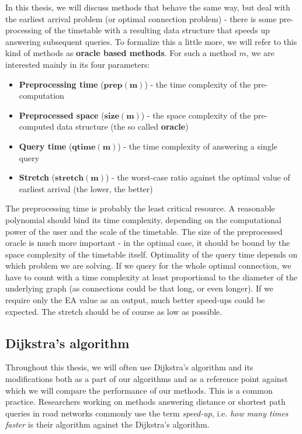 	In this thesis, we will discuss methods that behave the same way, but deal with the earliest arrival problem (or optimal connection problem) - there is some pre-processing of the timetable with a resulting data structure that speeds up answering subsequent queries. To formalize this a little more, we will refer to this kind of methods as \textbf{oracle based methods}. For such a method $m$, we are interested mainly in its four parameters:
	\begin{itemize}
		\item \textbf{Preprocessing time} ($\bm{prep(m)}$) - the time complexity of the pre-computation
		\item \textbf{Preprocessed space} ($\bm{size(m)}$) - the space complexity of the pre-computed data structure (the so called \textbf{oracle})
		\item \textbf{Query time} ($\bm{qtime(m)}$) - the time complexity of answering a single query
		\item \textbf{Stretch} ($\bm{stretch(m)}$) - the worst-case ratio against the optimal value of earliest arrival (the lower, the better)
	\end{itemize}
	\hspace*{\fill}
	
	\noindent The preprocessing time is probably the least critical resource. A reasonable polynomial should bind its time complexity, depending on the computational power of the user and the scale of the timetable. The size of the preprocessed oracle is much more important - in the optimal case, it should be bound by the space complexity of the timetable itself. Optimality of the query time depends on which problem we are solving. If we query for the whole optimal connection, we have to count with a time complexity at least proportional to the diameter of the underlying graph (as connections could be that long, or even longer). If we require only the EA value as an output, much better speed-ups could be expected. The stretch should be of course as low as possible.
	
\subsection{Dijkstra's algorithm} 
\label{subsec:dijkstra}
	
	\noindent Throughout this thesis, we will often use Dijkstra's algorithm and its modifications both as a part of our algorithms and as a reference point against which we will compare the performance of our methods. This is a common practice. Researchers working on methods answering distance or shortest path queries in road networks commonly use the term \textit{speed-up}, i.e. \textit{how many times faster} is their algorithm against the Dijkstra's algorithm.
	
